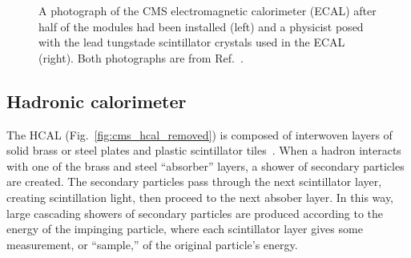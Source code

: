 \begin{figure}[htb]
    \centering
    \quad
    \caption[A photograph of the CMS electromagnetic calorimeter (ECAL) after half of the modules had been installed and a physicist posed with the lead tungstade scintillator crystals used in the ECAL]{
        A photograph of the CMS electromagnetic calorimeter (ECAL) after half of the modules had been installed (left) and a physicist posed with the lead tungstade scintillator crystals used in the ECAL (right). 
        Both photographs are from Ref.~\cite{Brice:1431477}.
    }
    \label{fig:cms_ecal}
\end{figure}

\subsection{Hadronic calorimeter}
The HCAL (Fig.~\ref{fig:cms_hcal_removed}) is composed of interwoven layers of solid brass or steel plates and plastic scintillator tiles~\cite{CERN-LHCC-97-031}. 
When a hadron interacts with one of the brass and steel ``absorber'' layers, a shower of secondary particles are created. %
The secondary particles pass through the next scintillator layer, creating scintillation light, then proceed to the next absober layer. 
In this way, large cascading showers of secondary particles are produced according to the energy of the impinging particle, where each scintillator layer gives some measurement, or ``sample,'' of the original particle's energy. 

